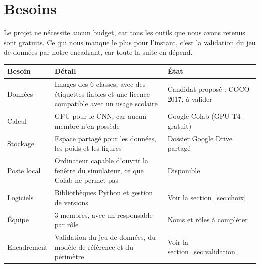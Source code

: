 \section{Besoins}
\label{sec:besoins}

Le projet ne nécessite aucun budget, car tous les outils que nous avons retenus sont gratuits. Ce qui nous manque le plus pour l'instant, c'est la validation du jeu de données par notre encadrant, car toute la suite en dépend.

\begin{center}
\begin{tabularx}{\textwidth}{>{\raggedright\arraybackslash}p{2.4cm}Y>{\raggedright\arraybackslash}p{4.4cm}}
  \toprule
  \textbf{Besoin} & \textbf{Détail} & \textbf{État} \\
  \midrule
  Données & Images des 6 classes, avec des étiquettes fiables et une licence compatible avec un usage scolaire & Candidat proposé : COCO 2017, à valider \\
  Calcul & GPU pour le CNN, car aucun membre n'en possède & Google Colab (GPU T4 gratuit) \\
  Stockage & Espace partagé pour les données, les poids et les figures & Dossier Google Drive partagé \\
  Poste local & Ordinateur capable d'ouvrir la fenêtre du simulateur, ce que Colab ne permet pas & Disponible \\
  Logiciels & Bibliothèques Python et gestion de versions & Voir la section~\ref{sec:choix} \\
  Équipe & 3 membres, avec un responsable par rôle & Noms et rôles à compléter \\
  Encadrement & Validation du jeu de données, du modèle de référence et du périmètre & Voir la section~\ref{sec:validation} \\
  \bottomrule
\end{tabularx}
\end{center}
